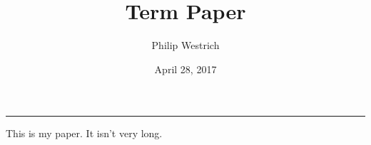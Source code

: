 \documentclass[12pt]{article}
\title{Term Paper}
\author{Philip Westrich}
\date{April 28, 2017}
\begin{document}
\maketitle

\vspace{-0.3in}
\noindent
\rule{\linewidth}{0.4pt}
\doublespacing

This is my paper. It isn't very long.
\end{document}

